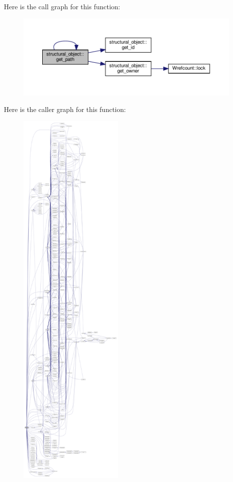 Here is the call graph for this function\+:
\nopagebreak
\begin{figure}[H]
\begin{center}
\leavevmode
\includegraphics[width=350pt]{d8/da3/classstructural__object_a08b6790c882b985060c53e32d695799b_cgraph}
\end{center}
\end{figure}
Here is the caller graph for this function\+:
\nopagebreak
\begin{figure}[H]
\begin{center}
\leavevmode
\includegraphics[height=550pt]{d8/da3/classstructural__object_a08b6790c882b985060c53e32d695799b_icgraph}
\end{center}
\end{figure}
\mbox{\label{classstructural__object_a81b6eec7ac344beeecb51f9f627b9cfe}} 
